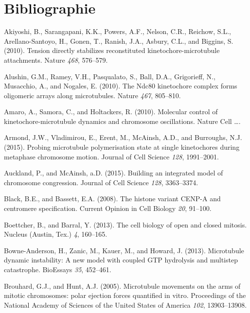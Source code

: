 \documentclass[12pt,a4paper,twoside,openright]{book}
\begin{document}
\clearpage\null

\backmatter

\chapter{Bibliographie}\label{bibliographie}



\hypertarget{refs}{}
\hypertarget{ref-Akiyoshi2010}{}
Akiyoshi, B., Sarangapani, K.K., Powers, A.F., Nelson, C.R., Reichow,
S.L., Arellano-Santoyo, H., Gonen, T., Ranish, J.A., Asbury, C.L., and
Biggins, S. (2010). Tension directly stabilizes reconstituted
kinetochore-microtubule attachments. Nature \emph{468}, 576--579.

\hypertarget{ref-Alushin2010}{}
Alushin, G.M., Ramey, V.H., Pasqualato, S., Ball, D.A., Grigorieff, N.,
Musacchio, A., and Nogales, E. (2010). The Ndc80 kinetochore complex
forms oligomeric arrays along microtubules. Nature \emph{467}, 805--810.

\hypertarget{ref-Amaro2010a}{}
Amaro, A., Samora, C., and Holtackers, R. (2010). Molecular control of
kinetochore-microtubule dynamics and chromosome oscillations. Nature
Cell \ldots{}.

\hypertarget{ref-Armond2015}{}
Armond, J.W., Vladimirou, E., Erent, M., McAinsh, A.D., and Burroughs,
N.J. (2015). Probing microtubule polymerisation state at single
kinetochores during metaphase chromosome motion. Journal of Cell Science
\emph{128}, 1991--2001.

\hypertarget{ref-Auckland2015a}{}
Auckland, P., and McAinsh, a.D. (2015). Building an integrated model of
chromosome congression. Journal of Cell Science \emph{128}, 3363--3374.

\hypertarget{ref-Black2008}{}
Black, B.E., and Bassett, E.A. (2008). The histone variant CENP-A and
centromere specification. Current Opinion in Cell Biology \emph{20},
91--100.

\hypertarget{ref-Boettcher2013}{}
Boettcher, B., and Barral, Y. (2013). The cell biology of open and
closed mitosis. Nucleus (Austin, Tex.) \emph{4}, 160--165.

\hypertarget{ref-Bowne-Anderson2013}{}
Bowne-Anderson, H., Zanic, M., Kauer, M., and Howard, J. (2013).
Microtubule dynamic instability: A new model with coupled GTP hydrolysis
and multistep catastrophe. BioEssays \emph{35}, 452--461.

\hypertarget{ref-Brouhard2005}{}
Brouhard, G.J., and Hunt, A.J. (2005). Microtubule movements on the arms
of mitotic chromosomes: polar ejection forces quantified in vitro.
Proceedings of the National Academy of Sciences of the United States of
America \emph{102}, 13903--13908.
\end{document}
